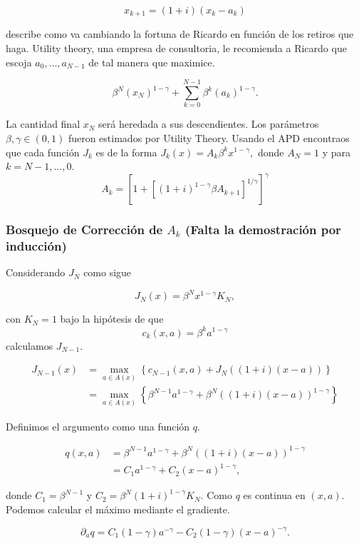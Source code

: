 \documentclass[oneside,spanish]{amsbook}
\numberwithin{section}{chapter}
\numberwithin{equation}{section}
\numberwithin{figure}{section}
\begin{document}
\[
x_{k+1}=\left(1+i\right)\left(x_{k}-a_{k}\right)
\]

describe como va cambiando la fortuna de Ricardo en función de los
retiros que haga. Utility theory, una empresa de consultoria, le recomienda
a Ricardo que escoja $a_{0},\ldots,a_{N-1}$ de tal manera que maximice. 

\[
\beta^{N}\left(x_{N}\right)^{1-\gamma}+\sum_{k=0}^{N-1}\beta^{k}\left(a_{k}\right)^{1-\gamma}.
\]

La cantidad final $x_{N}$ será heredada a sus descendientes. Los
parámetros $\beta,\gamma\in\left(0,1\right)$ fueron estimados por
Utility Theory. Usando el APD encontraos que cada función $J_{k}$
es de la forma $J_{k}\left(x\right)=A_{k}\beta^{k}x^{1-\gamma},$
donde $A_{N}=1$ y para $k=N-1,\ldots,0$. 
\[
A_{k}=\left[1+\left[\left(1+i\right)^{1-\gamma}\beta A_{k+1}\right]^{1/\gamma}\right]^{\gamma}
\]


\subsubsection*{Bosquejo de Corrección de $A_{k}$ (Falta la demostración por inducción)}

Considerando $J_{N}$ como sigue

\[
J_{N}\left(x\right)=\beta^{N}x^{1-\gamma}K_{N},
\]

con $K_{N}=1$ bajo la hipótesis de que 
\[
c_{k}\left(x,a\right)=\beta^{k}a^{1-\gamma}
\]
 calculamos $J_{N-1}$. 

\begin{align*}
J_{N-1}\left(x\right) & =\max_{a\in A\left(x\right)}\left\{ c_{N-1}(x,a)+J_{N}\left((1+i)(x-a)\right)\right\} \\
 & =\max_{a\in A\left(x\right)}\left\{ \beta^{N-1}a^{1-\gamma}+\beta^{N}\left((1+i)(x-a)\right)^{1-\gamma}\right\} 
\end{align*}

Definimos el argumento como una función $q$.

\begin{align*}
q(x,a) & =\beta^{N-1}a^{1-\gamma}+\beta^{N}\left((1+i)(x-a)\right)^{1-\gamma}\\
 & =C_{1}a^{1-\gamma}+C_{2}\left(x-a\right)^{1-\gamma},
\end{align*}

donde $C_{1}=\beta^{N-1}$ y $C_{2}=\beta^{N}(1+i)^{1-\gamma}K_{N}.$
Como $q$ es continua en $\left(x,a\right)$. Podemos calcular el
máximo mediante el gradiente. 

\[
\partial_{a}q=C_{1}\left(1-\gamma\right)a^{-\gamma}-C_{2}(1-\gamma)\left(x-a\right)^{-\gamma}.
\]
\end{document}
